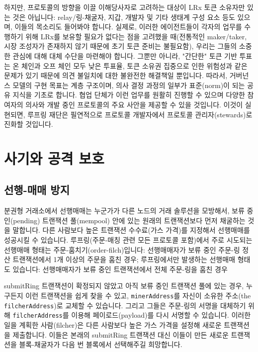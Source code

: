 \documentclass[UTF8,nofonts]{article}
\begin{document}
\begin{multicols}{2}
하지만, 프로토콜의 방향을 이끌 이해당사자로 고려하는 대상이 LRx 토큰 소유자만 있는 것은 아닙니다: relay/링-채굴자, 지갑, 개발자 및 기타 생태계 구성 요소 등도 있으며, 이들의 목소리도 들어봐야 합니다. 실제로, 이러한 에이전트들이 각자의 업무를 수행하기 위해 LRx를 보유할 필요가 없다는 점을 고려했을 때(전통적인 maker/taker, 시장 조성자가 존재하지 않기 때문에 초기 토큰 준비는 불필요함), 우리는 그들의 소중한 관심에 대해 대체 수단을 마련해야 합니다. 그뿐만 아니라, "간단한" 토큰 기반 투표는 온 체인과 오프 체인 모두 낮은 투표율, 토큰 소유권 집중으로 인한 위험성과 같은 문제가 있기 때문에 의견 불일치에 대한 불완전한 해결책일 뿐입니다. 따라서, 거버넌스 모델의 구현 목표는 계층 구조이며, 의사 결정 과정의 일부가 표준(norm)이 되는 공유 지식을 기초로 합니다. 협업 단체가 이런 업무를 원활히 진행할 수 있으며 다양한 참여자의 의사와 개발 중인 프로토콜의 주요 사안을 제공할 수 있을 것입니다. 이것이 실현되면, 루프링 재단은 필연적으로 프로토콜 개발자에서 프로토콜 관리자(stewards)로 진화할 것입니다.    

\section{사기와 공격 보호}

\subsection{선행-매매 방지\label{sec:dual_authoring}}

분권형 거래소에서 선행매매는 누군가가 다른 노드의 거래 솔루션을 모방해서, 보류 중인(pending) 트랜잭션 풀(mempool) 안에 있는 원래의 트랜잭션보다 먼저 채굴하는 것을 말합니다. 다른 사람보다 높은 트랜잭션 수수료(가스 가격)를 지정해서 선행매매를 성공시킬 수 있습니다. 루프링(주문-매칭 관련 모든 프로토콜 포함)에서 주로 시도되는 선행매매 형태는 주문-훔치기(order-filch)입니다: 선행매매자가 보류 중인 주문-링 정산 트랜잭션에서 1개 이상의 주문을 훔친 경우; 루프링에서만 발생하는 선행매매 형태도 있습니다: 선행매매자가 보류 중인 트랜잭션에서 전체 주문-링을 훔친 경우

submitRing 트랜잭션이 확정되지 않았고 아직 보류 중인 트랜잭션 풀에 있는 경우, 누구든지 이런 트랜잭션을 쉽게 찾을 수 있고, \verb|minerAddress|를 자신이 소유한 주소(the \verb|filcherAddress|)로 교체할 수 있습니다. 그리고 그들은 주문-링의 서명을 대체하기 위해 \verb|filcherAddress|를 이용해 페이로드(payload)를 다시 서명할 수 있습니다. 이러한 일을 계획한 사람(filcher)은 다른 사람보다 높은 가스 가격을 설정해 새로운 트랜잭션을 제출합니다. 이들은 본래의 submitRing 트랜잭션 대신 이들이 만든 새로운 트랜잭션을 블록-채굴자가 다음 번 블록에서 선택해주길 희망합니다.


\end{multicols}
\end{document}
